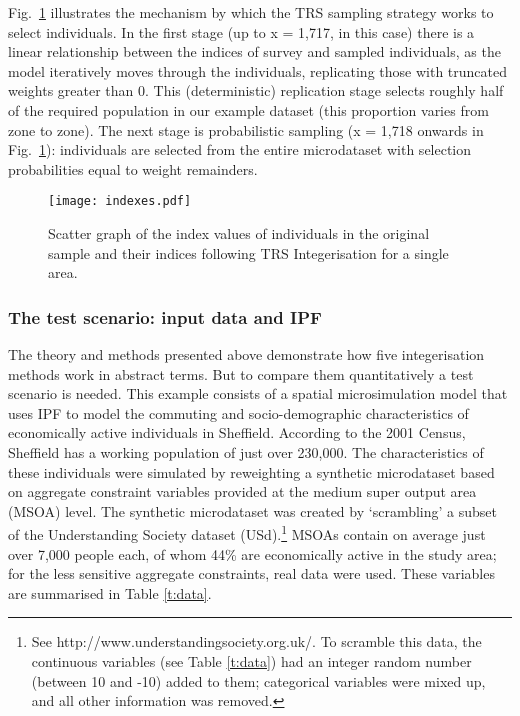 Fig.~\ref{fig:index-TRS} illustrates the mechanism by which the TRS sampling
strategy works to select individuals. In the first stage (up to x = 1,717,
in this case) there is a linear
relationship between the indices of survey and sampled individuals, as the
model iteratively moves through the individuals, replicating those with
truncated weights greater than 0. This
(deterministic) replication stage selects roughly half of the required
population
in our example dataset (this proportion varies from zone to zone).
The next stage is probabilistic sampling
(x = 1,718 onwards in Fig.~\ref{fig:index-TRS}): individuals are selected from
the entire microdataset with selection probabilities equal to weight remainders.


\begin{figure}[h]
 \centerline{
 \texttt{[image: indexes.pdf]}}
 \caption[Scatter graph of the index values of individuals]{Scatter graph of the
index values of individuals in the original sample and their indices following
TRS Integerisation for a single area. }
 \label{fig:index-TRS}
\end{figure}

\subsubsection{The test scenario: input data and IPF}
\label{worked-eg}
The theory and methods presented above demonstrate how five integerisation
methods work in abstract terms. But to compare them quantitatively a test
scenario is needed. This example consists of a spatial microsimulation model
that uses IPF to model the commuting and socio-demographic characteristics
of economically active individuals in
Sheffield. According to the 2001 Census, Sheffield has a working
population of just over 230,000. The characteristics of these
individuals were simulated by reweighting a synthetic microdataset based on
aggregate constraint variables provided at the medium super output area (MSOA)
level. The synthetic microdataset was created by `scrambling' a subset of the
Understanding Society dataset (USd).\footnote{See
http://www.understandingsociety.org.uk/. To scramble this data, the continuous
variables (see Table \ref{t:data}) had an integer random number (between 10 and
-10) added to them; categorical variables were mixed up, and all other
information was removed.} MSOAs
contain on average
just over 7,000 people each, of whom 44\% are economically active
in the study area; for the less sensitive aggregate constraints, real data were
used. These variables are summarised in Table \ref{t:data}.

